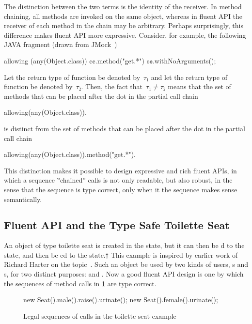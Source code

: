The distinction between the two terms is the identity of the receiver.
In method chaining, all methods are invoked on the same object, whereas in fluent API
  the receiver of each method in the chain may be arbitrary.
Perhaps surprisingly, this difference makes fluent API more expressive.
Consider, for example, the following JAVA fragment (drawn from JMock~\cite{Freeman:Pryce:06})
\begin{JAVA}
allowing (any(Object.class))
  ¢¢.method("get.*")
  ¢¢.withNoArguments();
\end{JAVA}
Let the return type of function  be denoted by~$τ₁$ and let the
  return type of function  be denoted by~$τ₂$.
Then, the fact that~$τ₁≠τ₂$ means that the set of methods that can be placed after the dot
  in the partial call chain
\begin{JAVA}
allowing(any(Object.class)).
\end{JAVA}
is distinct from the set of methods that can be placed after the dot in the partial call chain
\begin{JAVA}
allowing(any(Object.class)).method("get.*").
\end{JAVA}
This distinction makes it possible to design expressive and rich fluent APIs, in which a
  sequence ‟chained” calls is not only readable, but also robust, in the sense that the
  sequence is type correct, only when it the sequence makes sense semantically.

\subsection{Fluent API and the Type Safe Toilette Seat}

An object of type toilette seat is created in the  state, but it can
then be d to the  state, and then be ed to the
 state.†{%
  This example is inspired by earlier work of
  Richard Harter on the topic~\cite{Harter:05}.
}
Such an object be used by two kinds of users, s and s, for two distinct purposes:
   and .
Now a good fluent API design is one by which the sequences of method calls in
  \cref{Figure:toilette:legal} are type correct.

\begin{figure}[htbp]
  \begin{JAVA}
new Seat().male().raise().urinate();
new Seat().female().urinate();\end{JAVA}
  \caption{Legal sequences of calls in the toilette seat example}
  \label{Figure:toilette:legal}
\end{figure}

